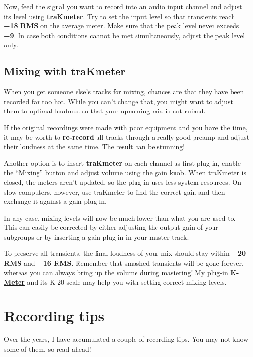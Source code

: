 Now, feed the signal you want to record into an audio input channel
and adjust its level using \textbf{traKmeter}.  Try to set the input
level so that transients reach \textbf{\SI{-18}{\dBFS} RMS} on the
average meter.  Make sure that the peak level never exceeds
\textbf{\SI{-9}{\dBFS}}.  In case both conditions cannot be met
simultaneously, adjust the peak level only.

\section{Mixing with traKmeter}
\label{sec:mixing_with_trakmeter}

When you get someone else's tracks for mixing, chances are that they
have been recorded far too hot.  While you can't change that, you
might want to adjust them to optimal loudness so that your upcoming
mix is not ruined.

If the original recordings were made with poor equipment and you have
the time, it may be worth to \textbf{re-record} all tracks through a
really good preamp and adjust their loudness at the same time.  The
result can be stunning!

Another option is to insert \textbf{traKmeter} on each channel as
first plug-in, enable the ``Mixing'' button and adjust volume using
the gain knob.  When traKmeter is closed, the meters aren't updated,
so the plug-in uses less system resources.  On slow computers,
however, use traKmeter to find the correct gain and then exchange it
against a gain plug-in.

In any case, mixing levels will now be much lower than what you are
used to.  This can easily be corrected by either adjusting the output
gain of your subgroups or by inserting a gain plug-in in your master
track.

To preserve all transients, the final loudness of your mix should stay
within \textbf{\SI{-20}{\dBFS} RMS} and \textbf{\SI{-16}{\dBFS} RMS}.
Remember that smashed transients will be gone forever, whereas you can
always bring up the volume during mastering!  My plug-in
\href{http://code.mzuther.de/}{\textbf{K-Meter}} and its K-20 scale
may help you with setting correct mixing levels.

\chapter{Recording tips}
\label{chap:recording_tips}

Over the years, I have accumulated a couple of recording tips.  You
may not know some of them, so read ahead!

